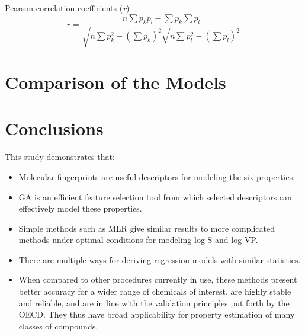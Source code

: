 \documentclass[10pt, letter]{article}
\renewcommand{\=}{\, =\, }
\newcommand{\+}{\, +\, }
\renewcommand{\-}{\, -\, }
\begin{document}
Pearson correlation coefficients (\textit{r})
\begin{equation}
r = \frac{n\sum{p_{k}p_{l}} - \sum{p_{k}}\sum{p_{l}}}{\sqrt{n\sum{p_{k}^{2}} - (\sum{p_{k}})^{2}\sqrt{n\sum{p_{l}^{2}} -(\sum{p_{l}})^{2}}}}
\end{equation}

\section{Comparison of the Models}


\section{Conclusions}

This study demonstrates that:
\begin{itemize}
\item Molecular fingerprints are useful descriptors for modeling the six properties.
\item GA is an efficient feature selection tool from which selected descriptors can
effectively model these properties.
\item Simple methods such as MLR give similar results to more complicated
methods under optimal conditions for modeling log S and log VP.
\item There are multiple ways for deriving regression models with similar statistics.
\item When compared to other procedures currently in use, these methods present better
accuracy for a wider range of chemicals of interest, are highly stable and reliable,
and are in line with the validation principles put forth by the OECD. They thus
have broad applicability for property estimation of many classes of compounds.
\end{itemize}
\end{document}
